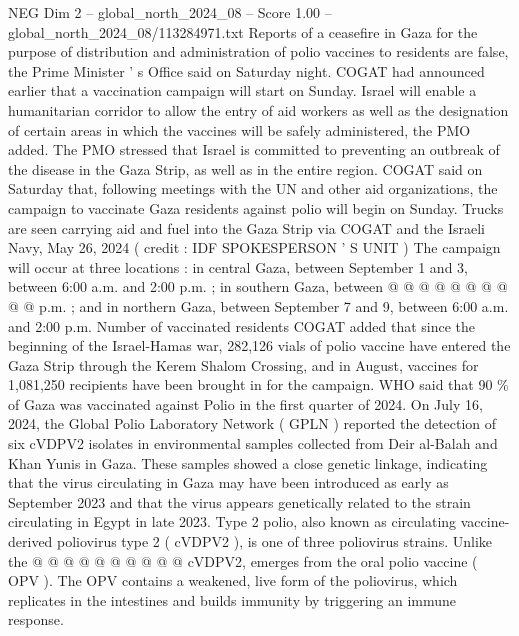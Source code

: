 \begin{textsample}{NEG Dim 2 – global\_north\_2024\_08 – Score 1.00 – global\_north\_2024\_08/113284971.txt}  \label{ex:f2_neg_357}
Reports of a ceasefire in Gaza for the purpose of distribution and administration of polio vaccines to residents are false, the Prime Minister ' s Office said on Saturday night.
COGAT had announced earlier that a vaccination campaign will start on Sunday.
Israel will enable a humanitarian corridor to allow the entry of aid workers as well as the designation of certain areas in which the vaccines will be safely administered, the PMO added.
The PMO stressed that Israel is committed to preventing an outbreak of the disease in the Gaza Strip, as well as in the entire region.
COGAT said on Saturday that, following meetings with the UN and other aid organizations, the campaign to vaccinate Gaza residents against polio will begin on Sunday.
Trucks are seen carrying aid and fuel into the Gaza Strip via COGAT and the Israeli Navy, May 26, 2024 ( credit : IDF SPOKESPERSON ' S UNIT ) The campaign will occur at three locations : in central Gaza, between September 1 and 3, between 6:00 a.m. and 2:00 p.m. ; in southern Gaza, between @ @ @ @ @ @ @ @ @ @ p.m. ; and in northern Gaza, between September 7 and 9, between 6:00 a.m. and 2:00 p.m.
Number of vaccinated residents COGAT added that since the beginning of the Israel-Hamas war, 282,126 vials of polio vaccine have entered the Gaza Strip through the Kerem Shalom Crossing, and in August, vaccines for 1,081,250 recipients have been brought in for the campaign.
WHO said that 90 \% of Gaza was vaccinated against Polio in the first quarter of 2024.
On July 16, 2024, the Global Polio Laboratory Network ( GPLN ) reported the detection of six cVDPV2 isolates in environmental samples collected from Deir al-Balah and Khan Yunis in Gaza.
These samples showed a close genetic linkage, indicating that the virus circulating in Gaza may have been introduced as early as September 2023 and that the virus appears genetically related to the strain circulating in Egypt in late 2023.
Type 2 polio, also known as circulating vaccine-derived poliovirus type 2 ( cVDPV2 ), is one of three poliovirus strains.
Unlike the @ @ @ @ @ @ @ @ @ @ cVDPV2, emerges from the oral polio vaccine ( OPV ).
The OPV contains a weakened, live form of the poliovirus, which replicates in the intestines and builds immunity by triggering an immune response.

\end{textsample}
